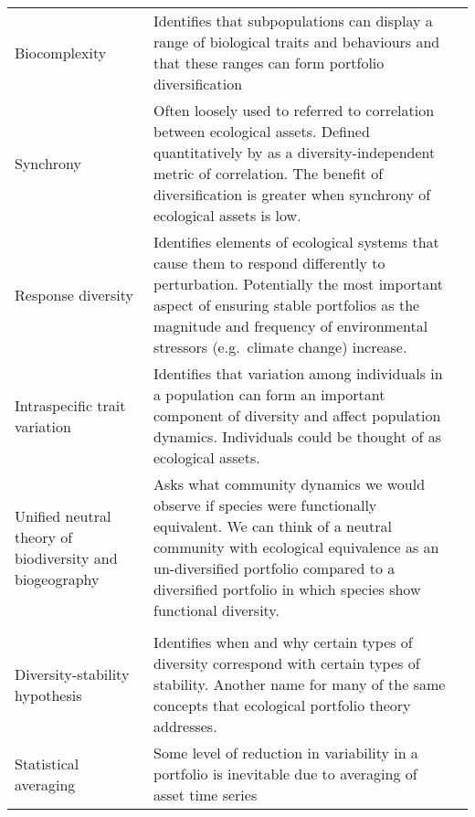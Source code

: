 \begin{small}
\begin{longtable}{>{\RaggedRight}p{3.6cm}>{\RaggedRight}p{7.3cm}>{\RaggedRight}p{3.6cm}}
Biocomplexity &
Identifies that subpopulations can display a range of biological traits and behaviours and that these ranges can form portfolio diversification &
\citep{hilborn2003, hutchinson2008}\\

Synchrony &
Often loosely used to referred to correlation between ecological assets. Defined quantitatively by \citet{loreau2008} as a diversity-independent metric of correlation. The benefit of diversification is greater when synchrony of ecological assets is low. &
\citep{ranta1998, loreau2008, moore2010}\\

Response diversity &
Identifies elements of ecological systems that cause them to respond differently to perturbation. Potentially the most important aspect of ensuring stable portfolios as the magnitude and frequency of environmental stressors (e.g.\ climate change) increase. &
\citep{elmqvist2003, loreau2008, loreau2013}\\

Intraspecific trait variation &
Identifies that variation among individuals in a population can form an important component of diversity and affect population dynamics. Individuals could be thought of as ecological assets. &
\citep{bolnick2011}\\

Unified neutral theory of biodiversity and biogeography &
Asks what community dynamics we would observe if species were functionally equivalent. We can think of a neutral community with ecological equivalence as an un-diversified portfolio compared to a diversified portfolio in which species show functional diversity. &
\citep{hubbell2001}\\



\midrule
\multicolumn{2}{l}{\textbf{Risk-reduction consequences of diversity}}\\
\midrule

Diversity-stability hypothesis &
Identifies when and why certain types of diversity correspond with certain types of stability. Another name for many of the same concepts that ecological portfolio theory addresses.  &
\citep{ives2007, loreau2013}\\

Statistical averaging &
Some level of reduction in variability in a portfolio is inevitable due to averaging of asset time series &
\citep{doak1998}\\


\end{longtable}
\end{small}
